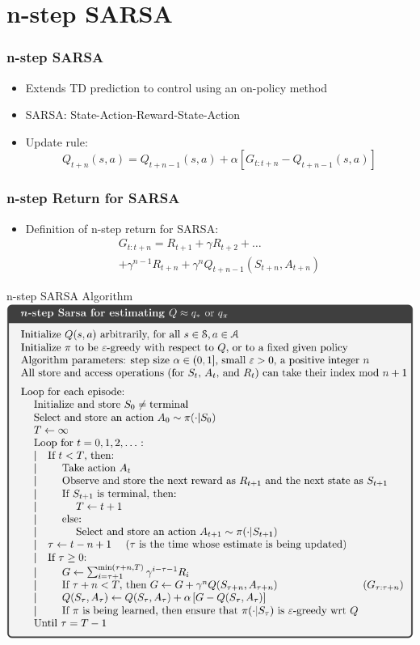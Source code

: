 \documentclass{beamer}
\begin{document}
    \section{n-step SARSA}
    \begin{frame}
        \frametitle{n-step SARSA}
        \begin{itemize}
            \item Extends TD prediction to control using an on-policy method
            \item SARSA: State-Action-Reward-State-Action
            \item Update rule:
            $$
            Q_{t+n}(s,a) = Q_{t+n-1}(s,a) + \alpha \left[G_{t:t+n} - Q_{t+n-1}(s,a)\right]
            $$
        \end{itemize}
    \end{frame}


    \begin{frame}
        \frametitle{n-step Return for SARSA}
        \begin{itemize}
            \item Definition of n-step return for SARSA:
            \begin{multline*}
                G_{t:t+n} = R_{t+1} + \gamma R_{t+2} + \ldots \\
                + \gamma^{n-1} R_{t+n} + \gamma^n Q_{t+n-1}(S_{t+n}, A_{t+n})
            \end{multline*}
        \end{itemize}
    \end{frame}

    \begin{frame}{n-step SARSA Algorithm}
        \includegraphics[width=\textwidth]{n-step-sarsa-alg.png}
    \end{frame}
\end{document}
